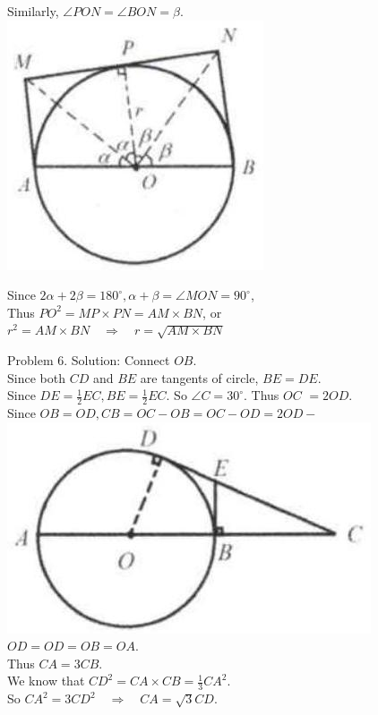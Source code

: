 \documentclass[10pt]{article}
\begin{document}
Similarly, \(\angle P O N=\angle B O N=\beta\).\\
\includegraphics[max width=\textwidth, center]{2025_04_17_97bc1f7e44d93c271a88g-158(1)}

Since \(2 \alpha+2 \beta=180^{\circ}, \alpha+\beta=\angle M O N=90^{\circ}\),\\
Thus \(P O^{2}=M P \times P N=A M \times B N\), or\\
\(r^{2}=A M \times B N \quad \Rightarrow \quad r=\sqrt{A M \times B N}\)

Problem 6. Solution:
Connect \(O B\).\\
Since both \(C D\) and \(B E\) are tangents of circle, \(B E=D E\).\\
Since \(D E=\frac{1}{2} E C, B E=\frac{1}{2} E C\). So \(\angle C=30^{\circ}\). Thus \(O C\) \(=2 O D\).\\
Since \(O B=O D, C B=O C-O B=O C-O D=2 O D-\)\\
\includegraphics[max width=\textwidth, center]{2025_04_17_97bc1f7e44d93c271a88g-158(2)}\\
\(O D=O D=O B=O A\).\\
Thus \(C A=3 C B\).\\
We know that \(C D^{2}=C A \times C B=\frac{1}{3} C A^{2}\).\\
So \(C A^{2}=3 C D^{2} \quad \Rightarrow \quad C A=\sqrt{3} C D\).
\end{document}
